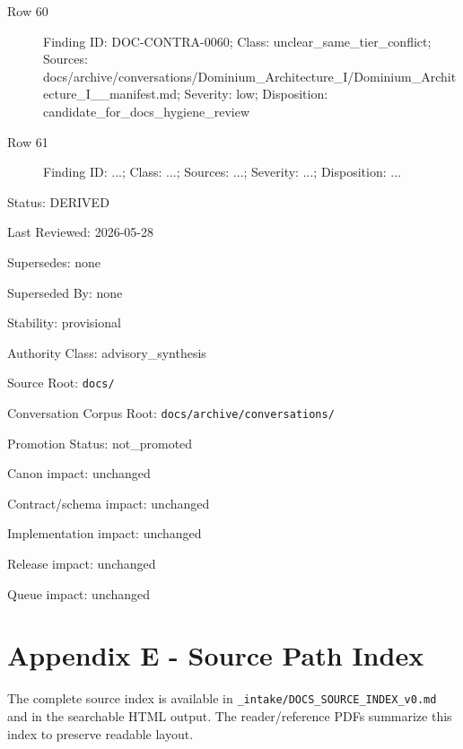 \documentclass[9pt,a4paper]{book}
\begin{document}
\begin{description}
\item[Row 60] Finding ID: DOC-\allowbreak{}CONTRA-\allowbreak{}0060; Class: unclear\_\allowbreak{}same\_\allowbreak{}tier\_\allowbreak{}conflict; Sources: docs/\allowbreak{}archive/\allowbreak{}conversations/\allowbreak{}Dominium\_\allowbreak{}Architecture\_\allowbreak{}I/\allowbreak{}Dominium\_\allowbreak{}Architecture\_\allowbreak{}I\_\allowbreak{}\_\allowbreak{}manifest.\allowbreak{}md; Severity: low; Disposition: candidate\_\allowbreak{}for\_\allowbreak{}docs\_\allowbreak{}hygiene\_\allowbreak{}review
\item[Row 61] Finding ID: .\allowbreak{}.\allowbreak{}.\allowbreak{}; Class: .\allowbreak{}.\allowbreak{}.\allowbreak{}; Sources: .\allowbreak{}.\allowbreak{}.\allowbreak{}; Severity: .\allowbreak{}.\allowbreak{}.\allowbreak{}; Disposition: .\allowbreak{}.\allowbreak{}.\allowbreak{}
\end{description}


Status: DERIVED

Last Reviewed: 2026-\allowbreak{}05-\allowbreak{}28

Supersedes: none

Superseded By: none

Stability: provisional

Authority Class: advisory\_\allowbreak{}synthesis

Source Root: \texttt{docs/\allowbreak{}}

Conversation Corpus Root: \texttt{docs/\allowbreak{}archive/\allowbreak{}conversations/\allowbreak{}}

Promotion Status: not\_\allowbreak{}promoted

Canon impact: unchanged

Contract/\allowbreak{}schema impact: unchanged

Implementation impact: unchanged

Release impact: unchanged

Queue impact: unchanged


\part{Appendix E -\allowbreak{} Source Path Index}

The complete source index is available in \texttt{\_\allowbreak{}intake/\allowbreak{}DOCS\_\allowbreak{}SOURCE\_\allowbreak{}INDEX\_\allowbreak{}v0.\allowbreak{}md} and in the searchable HTML output.\allowbreak{} The reader/\allowbreak{}reference PDFs summarize this index to preserve readable layout.\allowbreak{}
\end{document}
